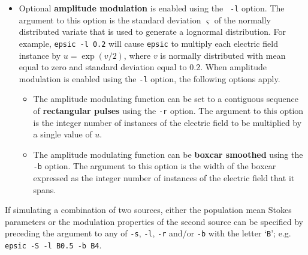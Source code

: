 \documentclass[12pt]{article}
\begin{document}
\begin{itemize}
\item Optional {\bf amplitude modulation} is enabled using the {\tt
  -l} option.  The argument to this option is the standard deviation
  $\varsigma$ of the normally distributed variate that is used to
  generate a lognormal distribution.  For example, {\tt epsic -l
    0.2} will cause {\tt epsic} to multiply each electric field
  instance by $u=\exp(v/2)$, where $v$ is normally distributed with
  mean equal to zero and standard deviation equal to 0.2.  When
  amplitude modulation is enabled using the {\tt -l} option, the
  following options apply.
  
  \begin{itemize}
  \item
    The amplitude modulating function can be set to a contiguous
    sequence of {\bf rectangular pulses} using the {\tt -r} option.  The
    argument to this option is the integer number of instances of the
    electric field to be multiplied by a single value of $u$. 
  \item
    The amplitude modulating function can be {\bf boxcar smoothed} using the
    {\tt -b} option.  The argument to this option is the width of the
    boxcar expressed as the integer number of instances of the
    electric field that it spans.
  \end{itemize}

\end{itemize}
%

\noindent
If simulating a combination of two sources, either the population mean
Stokes parameters or the modulation properties of
  the second source can be specified by preceding the argument to any
  of {\tt -s}, {\tt -l}, {\tt -r} and/or {\tt -b} with the letter `{\tt B}';
  e.g. {\tt epsic -S -l B0.5 -b B4}.
  
\end{document}
